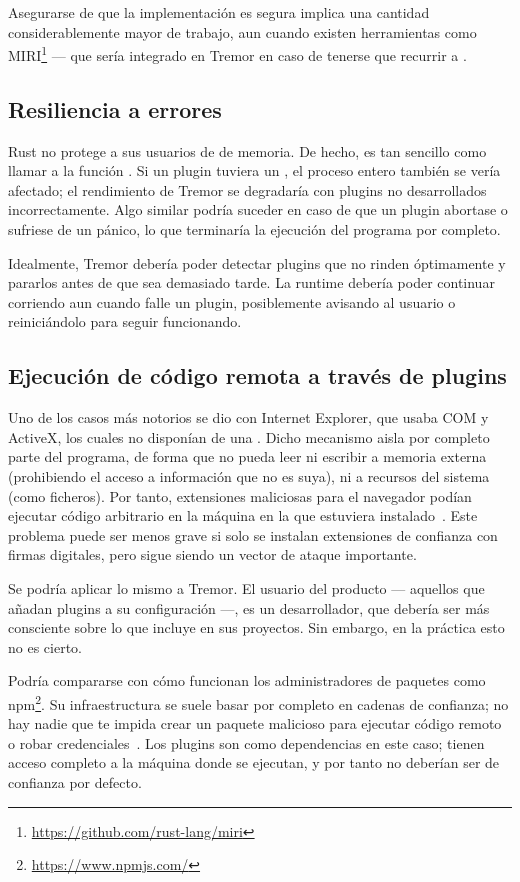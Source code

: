 Asegurarse de que la implementación es segura implica una cantidad
considerablemente mayor de trabajo, aun cuando existen herramientas como
MIRI\footnote{\url{https://github.com/rust-lang/miri}} --- que sería integrado
en Tremor en caso de tenerse que recurrir a \unsafe.

\subsection{Resiliencia a errores}

Rust no protege a sus usuarios de \leaks de memoria. De hecho, es tan sencillo
como llamar a la función . Si un plugin tuviera un \leak, el
proceso entero también se vería afectado; el rendimiento de Tremor se degradaría
con plugins no desarrollados incorrectamente. Algo similar podría suceder en
caso de que un plugin abortase o sufriese de un pánico, lo que terminaría la
ejecución del programa por completo.

Idealmente, Tremor debería poder detectar plugins que no rinden óptimamente y
pararlos antes de que sea demasiado tarde. La runtime debería poder continuar
corriendo aun cuando falle un plugin, posiblemente avisando al usuario o
reiniciándolo para seguir funcionando.

\subsection{Ejecución de código remota a través de plugins}

Uno de los casos más notorios se dio con Internet Explorer, que usaba COM y
ActiveX, los cuales no disponían de una \sandbox. Dicho mecanismo aisla por
completo parte del programa, de forma que no pueda leer ni escribir a memoria
externa (prohibiendo el acceso a información que no es suya), ni a recursos del
sistema (como ficheros). Por tanto, extensiones maliciosas para el navegador
podían ejecutar código arbitrario en la máquina en la que estuviera
instalado~\cite{iesandbox}. Este problema puede ser menos grave si solo se
instalan extensiones de confianza con firmas digitales, pero sigue siendo un
vector de ataque importante.

Se podría aplicar lo mismo a Tremor. El usuario del producto --- aquellos que
añadan plugins a su configuración ---, es un desarrollador, que debería ser más
consciente sobre lo que incluye en sus proyectos. Sin embargo, en la práctica
esto no es cierto.

Podría compararse con cómo funcionan los administradores de paquetes como
npm\footnote{\url{https://www.npmjs.com/}}. Su infraestructura se suele basar
por completo en cadenas de confianza; no hay nadie que te impida crear un
paquete malicioso para ejecutar código remoto o robar
credenciales~\cite{npm1}\cite{npm2}. Los plugins son como dependencias en este
caso; tienen acceso completo a la máquina donde se ejecutan, y por tanto no
deberían ser de confianza por defecto.

